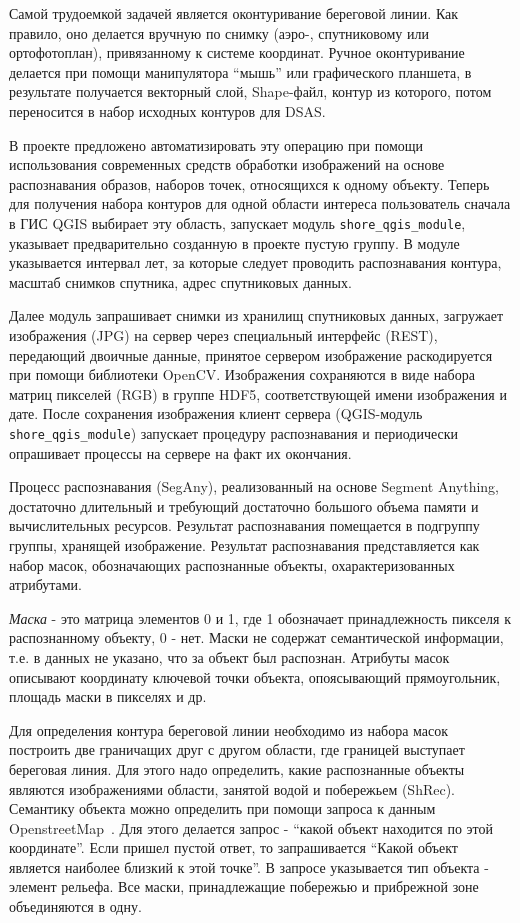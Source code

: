 \documentclass[732,14pt,final]{studrep}
\begin{document}
Самой трудоемкой задачей является оконтуривание береговой линии. Как правило, оно делается вручную по снимку (аэро-, спутниковому или ортофотоплан), привязанному к системе координат. Ручное оконтуривание делается при помощи манипулятора “мышь” или графического планшета, в результате получается векторный слой, Shape-файл, контур из которого, потом переносится в набор исходных контуров для DSAS.

В проекте предложено автоматизировать эту операцию при помощи использования современных средств обработки изображений на основе распознавания образов, наборов точек, относящихся к одному объекту. Теперь для получения набора контуров для одной области интереса пользователь сначала в ГИС QGIS выбирает эту область, запускает модуль \verb|shore_qgis_module|, указывает предварительно созданную в проекте пустую группу. В модуле указывается интервал лет, за которые следует проводить распознавания контура, масштаб снимков спутника, адрес спутниковых данных.

Далее модуль запрашивает снимки из хранилищ спутниковых данных, загружает изображения (JPG) на сервер через специальный интерфейс (REST), передающий двоичные данные, принятое сервером изображение раскодируется при помощи библиотеки OpenCV. Изображения сохраняются в виде набора матриц пикселей (RGB) в группе HDF5, соответствующей имени изображения и дате. После сохранения изображения клиент сервера (QGIS-модуль \verb|shore_qgis_module|) запускает процедуру распознавания и периодически опрашивает процессы на сервере на факт их окончания.

Процесс распознавания (SegAny), реализованный на основе Segment Anything, достаточно длительный и требующий достаточно большого объема памяти и вычислительных ресурсов. Результат распознавания помещается в подгруппу группы, хранящей изображение. Результат распознавания представляется как набор масок, обозначающих распознанные объекты, охарактеризованных атрибутами. 

\emph{Маска} - это матрица элементов 0 и 1, где 1 обозначает принадлежность пикселя к распознанному объекту, 0 - нет. Маски не содержат семантической информации, т.е. в данных не указано, что за объект был распознан. Атрибуты масок описывают координату ключевой точки объекта, опоясывающий прямоугольник, площадь маски в пикселях и др.

Для определения контура береговой линии необходимо из набора масок построить две граничащих друг с другом области, где границей выступает береговая линия. Для этого надо определить, какие распознанные объекты являются изображениями области, занятой водой и побережьем (ShRec). Семантику объекта можно определить при помощи запроса к данным OpenstreetMap~\cite{osm}. Для этого делается запрос - “какой объект находится по этой координате”. Если пришел пустой ответ, то запрашивается “Какой объект является наиболее близкий к этой точке”. В запросе указывается тип объекта - элемент рельефа. Все маски, принадлежащие побережью и прибрежной зоне объединяются в одну.
\end{document}

